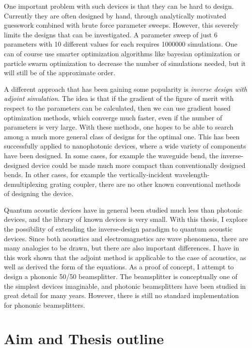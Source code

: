 One important problem with such devices is that they can be hard to design.
Currently they are often designed by hand,
through analytically motivated guesswork combined with brute force parameter
sweeps.
However, this severely limits the designs that can be investigated.
A parameter sweep of just 6 parameters with 10 different values for each
requires \num{1000000} simulations.
One can of course use smarter optimization algorithms like bayesian optimization
or particle swarm optimization\cite{schneider2019benchmarking,zhang_compact_2013}
to decrease the number of simulations needed, but it will still be of the
approximate order.

A different approach that has been gaining some popularity is
\emph{inverse design with adjoint simulation}.%
\cite{molesky_inverse_2018}
The idea is that if the gradient of the figure of merit
with respect to the parameters can be calculated, then we can use gradient based
optimization methods, which converge much faster, even if the number of
parameters is very large. With these methods, one hopes to be able to search
among a much more general class of designs for the optimal one.
This has been successfully applied to nanophotonic devices,
where a wide variety of components have been designed\cite{spins2019}.
In some cases, for example the waveguide bend, the inverse-designed device could
be made much more compact than conventionally designed
bends.\cite{jensen_systematic_2004}
In other cases, for example the vertically-incident wavelength-demultiplexing
grating coupler, there are no other known conventional methods of designing the
device.\cite{piggott_inverse_2014}

Quantum acoustic devices have in general been studied much less than photonic
devices, and the library of known devices is very small.
With this thesis, I explore the possibility of extending the inverse-design paradigm to
quantum acoustic devices.
Since both acoustics and electromagnetics are wave phenomena, there are many
analogies to be drawn, but there are also important differences.
I have in this work shown that the adjoint method is applicable to the case of
acoustics, as well as derived the form of the equations.
As a proof of concept, I attempt to design a phononic 50/50 beamsplitter.
The beamsplitter is conceptually one of the simplest devices imaginable,
and photonic beamsplitters have been studied in great detail for many years.
However, there is still no standard implementation for phononic beamsplitters.

\section{Aim and Thesis outline}

